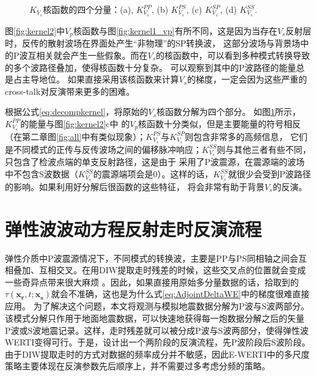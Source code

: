 \begin{figure}[!htb]
   \caption{$K_{V_s}$核函数的四个分量：(a), $K_{V_s}^{PP}$, (b) $K_{V_s}^{PS}$, (c) $K_{V_s}^{SP}$, (d) $K_{V_s}^{SS}$.}
   \label{fig:kernel2_vs_decomp}
\end{figure}
图\ref{fig:kernel2}中$V_p$核函数与图\ref{fig:kernel1_vp}有所不同，这是因为当存在$V_s$反射层时，反传的散射波场在界面处产生“非物理”的SP转换波，
这部分波场与背景场中的P波互相关就会产生一些假象。而在$V_s$的核函数中，可以看到多种模式转换导致的多个波路径叠加，使得核函数十分复杂。
可以观察到其中的P波路径的能量总是占主导地位。
如果直接采用该核函数来计算$V_s$的梯度，一定会因为这些严重的cross-talk对反演带来更多的困难。

根据公式\eqref{eq:decompkernel}，将原始的$V_s$核函数分解为四个部分。
如图\ref{fig:kernel2_vs_decomp}所示，$K_{V_s}^{PP}$的能量与图\ref{fig:kernel2}c中
的$V_p$核函数十分类似，但是主要能量的符号相反（在第二章图\ref{fig:all}中有类似现象）；$K_{V_s}^{PS}$与$K_{V_s}^{SP}$则包含非常多的高频信息，
它们是不同模式的正传与反传波场之间的偏移脉冲响应；$K_{V_s}^{SS}$则与其他三者有些不同，只包含了检波点端的单支反射路径，这是由于
采用了P波震源，在震源端的波场中不包含S波数据（$K_{V_s}^{SS}$的震源端项会是0）。这样的话，$K_{V_s}^{SS}$就很少会受到P波路径的影响。如果利用好分解后很函数的这些特征，
将会非常有助于背景$V_s$的反演。
\section{弹性波波动方程反射走时反演流程}
弹性介质中P波震源情况下，不同模式的转换波，主要是PP与PS同相轴之间会互相叠加、互相交叉。在用DIW提取走时残差的时候，这些交叉点的位置就会变成一些奇异点带来很大麻烦
。因此，如果直接用原始多分量数据的话，拾取到的$\tau(\mathbf{x_r},t;\mathbf{x_s})$就会不准确，这也是为什么式\eqref{eq:AdjointDeltaWE}中的梯度很难直接应用。
为了解决这个问题，本文将观测与模拟地震数据分解为P波与S波两部分。该模式分解只作用于地面地震数据\cite[]{Li2016a}，可以快速地获得每一炮数据分解之后的矢量
P波或S波地震记录。这样，走时残差就可以被分成P波与S波两部分，使得弹性波WERTI变得可行。于是，设计出一个两阶段的反演流程，先P波阶段后S波阶段。
由于DIW提取走时的方式对数据的频率成分并不敏感，因此E-WERTI中的多尺度策略主要体现在反演参数先后顺序上，并不需要过多考虑分频的策略。
